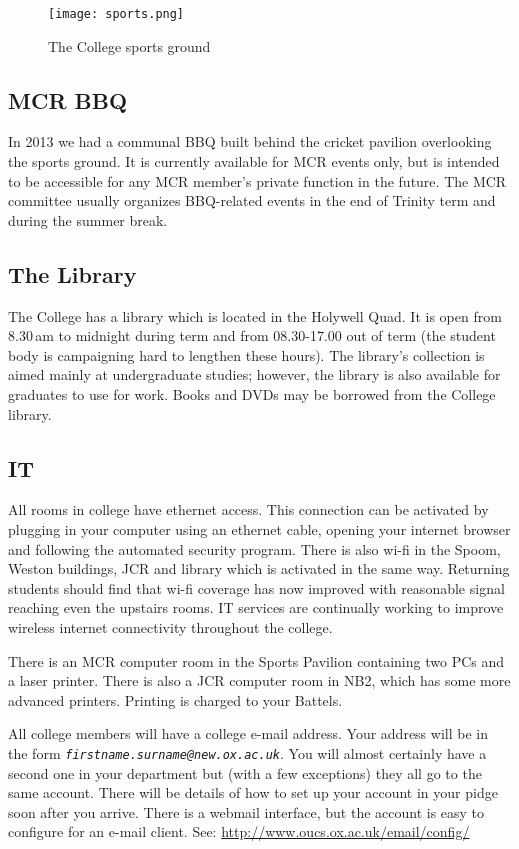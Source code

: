 \begin{figure}[htbp]
\centering
\texttt{[image: sports.png]}
\caption[]{The College sports ground}
\label{fig:sports}
\end{figure}

\subsection{MCR BBQ}
In 2013 we had a communal BBQ built behind the cricket pavilion overlooking the sports ground. It is currently available for MCR events only, but is intended to be accessible for any MCR member's private function in the future. The MCR committee usually organizes BBQ-related events in the end of Trinity term and during the summer break.
\subsection{The Library}
The College has a library which is located in the Holywell Quad. It is open from
8.30\,am to midnight during term and from 08.30-17.00 out of term (the student body is campaigning hard to lengthen these hours). The library's collection is aimed mainly at undergraduate studies; however, the library is also available for graduates to use for work. Books and DVDs may be borrowed from the College library.
\subsection{IT}
All rooms in college have ethernet access. This connection can be activated by plugging in your computer using an ethernet cable, opening your internet browser and following the automated security program. There is also wi-fi in the Spoom, Weston buildings, JCR and library which is activated in the same way. Returning students should  find that wi-fi coverage has now improved with reasonable signal reaching even the upstairs rooms. IT services are continually working to improve wireless internet connectivity throughout the college. 

There is an MCR computer room in the Sports Pavilion containing two PCs and a laser printer. There is also a JCR computer room in NB2, which has some more advanced printers. Printing is charged to your Battels. 

All college members will have a college e-mail address. Your address will be in the
form \emph{\nolinkurl{firstname.surname@new.ox.ac.uk}}. You will almost
certainly have a second one in your department but (with a few exceptions) they all go to the same account.
There will be details of how to set up your account in your pidge soon after you
arrive. There is a webmail interface, but the account is easy to configure for
an e-mail client. See: \url{http://www.oucs.ox.ac.uk/email/config/}

